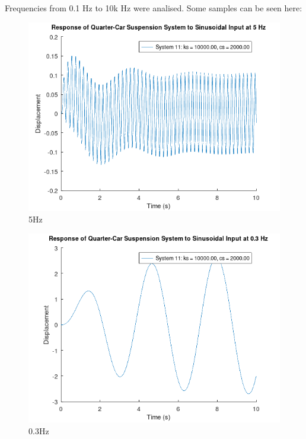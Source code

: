 \documentclass[11pt]{article}
\begin{document}
Frequencies from 0.1 Hz to 10k Hz were analised. Some samples can be seen here:
\begin{figure}[H]
    \centering
    \includegraphics[width=.9\linewidth]{ENG204-Assignment-2-Sinusoidal-f-5.png}
    \caption{5Hz}
    \label{fig:5hz}
\end{figure}
\begin{figure}[H]
    \centering
    \includegraphics[width=.9\linewidth]{ENG204-Assignment-2-Sinusoidal-f-0.3.png}
    \caption{0.3Hz}
    \label{fig:0.3hz}
\end{figure}
\end{document}
